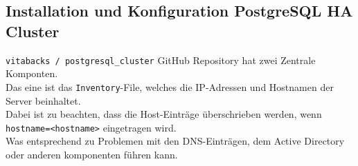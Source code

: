 
\begin{flushleft}
    \subsection{Installation und Konfiguration PostgreSQL HA Cluster}
    \texttt{vitabacks / postgresql\_cluster} \Gls{GitHub} Repository hat zwei Zentrale Komponten.\\
    Das eine ist das \texttt{Inventory}-File, welches die IP-Adressen und Hostnamen der Server beinhaltet.\\
    Dabei ist zu beachten, dass die Host-Einträge überschrieben werden, wenn \texttt{hostname=<hostname>} eingetragen wird.\\
    Was entsprechend zu Problemen mit den DNS-Einträgen, dem Active Directory oder anderen komponenten führen kann.
\end{flushleft}
